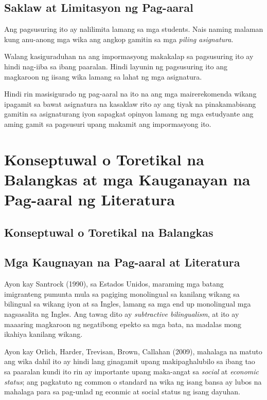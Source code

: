\documentclass [11pt] {report}
\begin{document}
\pagebreak
\section {Saklaw at Limitasyon ng Pag-aaral}
Ang pagsusuring ito ay nalilimita lamang sa mga \glspl{student}. Nais
naming malaman kung anu-anong mga wika ang angkop gamitin sa mga \emph{piling
  asignatura}.

Walang kasiguraduhan na ang impormasyong makakalap sa pagsusuring ito ay hindi
nag-iiba sa ibang paaralan. Hindi layunin ng pagsusuring ito ang magkaroon ng
iisang wika lamang sa lahat ng mga asignatura.

Hindi rin masisigurado ng pag-aaral na ito na ang mga mairerekomenda wikang
ipagamit sa bawat asignatura na kasaklaw rito ay ang tiyak na pinakamabisang
gamitin sa asignaturang iyon sapagkat opinyon lamang ng mga estudyante ang aming
gamit sa pagsusuri upang makamit ang impormasyong ito.

\printglossary

\chapter{Konseptuwal o Toretikal na Balangkas at mga Kauganayan na Pag-aaral ng Literatura}
\section {Konseptuwal o Toretikal na Balangkas}
\pagebreak
\section {Mga Kaugnayan na Pag-aaral at Literatura}
Ayon kay Santrock (1990), sa Estados Unidos, maraming mga batang imigranteng
pumunta mula sa pagiging monolingual sa kanilang wikang sa bilingual sa wikang
iyon at sa Ingles, lamang sa mga end up monolingual mga nagsasalita ng Ingles.
Ang tawag dito ay \emph{subtractive bilingualism}, at ito ay maaaring magkaroon
ng negatibong epekto sa mga bata, na madalas mong ikahiya kanilang wikang.

Ayon kay Orlich, Harder, Trevisan, Brown, Callahan (2009), mahalaga na matuto ang
wika dahil ito ay hindi lang ginagamit upang makipaghalubilo sa ibang tao sa
paaralan kundi ito rin ay importante upang maka-angat sa \emph{social} at
\emph{economic status}; ang pagkatuto ng common o standard na wika ng isang
bansa ay lubos na mahalaga para sa pag-unlad ng econmic at social status ng
isang dayuhan.
\end{document}
